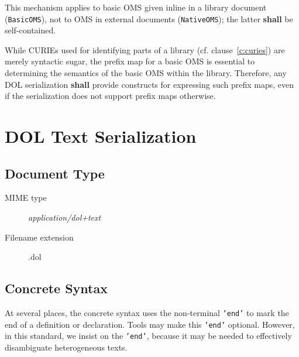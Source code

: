 \documentclass[10pt,fleqn,%
\ifpretendfinal
final%
\else
draft%
\fi,
]{scrreprt}
\makeatletter
\newcommand*{\cf}{cf.\@\xspace}
\newcommand*{\eg}{e.g.\@\xspace}
\newcommand*\CommentAuthor{}
\renewcommand*\CommentAuthor{#1}}
\newcommand*\CommentDate{}
\renewcommand*\CommentDate{#1}}
\newcommand*\CommentId{}
\renewcommand*\CommentId{#1}}
\newcommand*\CommentType{}
\renewcommand*\CommentType{#1}}
\newcommand*{\SetCommentColorByType}[1]{%
\edef\localType{{#1}}%
\expandafter\ifstrequal\localType{q-aut}{\colorlet{CommentColor}{red}}{%
\expandafter\ifstrequal\localType{q-all}{\colorlet{CommentColor}{orange}}{%
\expandafter\ifstrequal\localType{todo}{\colorlet{CommentColor}{orange}}{%
\expandafter\ifstrequal\localType{fyi}{\colorlet{CommentColor}{lightgray}}{%
\colorlet{CommentColor}{yellow}}}}}}
\newcommand*{\SetCommentPrefixByType}[1]{%
\edef\localType{{#1}}%
\expandafter\@ifmtarg\localType{%
\edef\CommentPrefix{}%
}{%
\caseupper[q]{#1}%
\edef\CommentPrefix{\thestring: }%
}}
\newcommand*{\initComment}[1]{%
\setkeys{Comment}{#1}%
\SetCommentColorByType{\CommentType}%
\relax%
\SetCommentPrefixByType{\CommentType}%
\relax%
}
\newcommand*{\todonote}[2][]{%
\initComment{#1}%
\pdfcomment[author=\CommentAuthor,color=CommentColor,date=\CommentDate,id=\CommentId]{%
\CommentPrefix
#2}}
\renewcommand*{\todonote}[2][]{%
\initComment{#1}%
\ednote{\CommentPrefix #2}}
\newcommand*{\mimetype}[1]{\textit{#1}}
\newcommand*{\syntax}[1]{\texttt{#1}}
\newcommand*{\shall}{\textbf{shall}\xspace}
\newcommand{\clauserefname}{clause}
\newcommand{\cref}[1]{\clauserefname~\ref{#1}}
\newcommand{\clause}[1]{\chapter{#1}}
\newcommand{\sclause}[1]{\section{#1}}
\newcommand{\nisref}[1]{#1}
\makeatother
\begin{document}
This mechanism applies to basic OMS given inline in a library document (\syntax{BasicOMS}), not to OMS in external documents (\syntax{NativeOMS}); the latter \shall be self-contained.

While CURIEs used for identifying parts of a library (\cf \cref{c:curies}) are merely syntactic 
sugar, the prefix map for a basic OMS is essential to determining the semantics of the basic OMS 
within the library.  Therefore, any DOL serialization \shall provide constructs for expressing such 
prefix maps, even if the serialization does not support prefix maps otherwise.







\clause{DOL Text Serialization}\label{a:text-syntax}

\sclause{Document Type}

\begin{description}
\item[MIME type] \mimetype{application/dol+text}
\item[Filename extension] .dol
\end{description}

\sclause{Concrete Syntax}\label{a:dol-text:concrete}

At several places, the concrete syntax uses the non-terminal
\syntax{'end'} to mark the end of a definition or declaration. Tools
may make this \syntax{'end'} optional. However, in this standard,
we insist on the \syntax{'end'}, because it may be needed to effectively
disambiguate heterogeneous texts.
\end{document}
